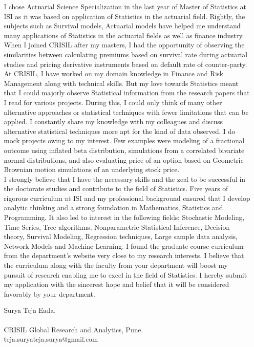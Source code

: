 \documentclass[10pt]{article}
\begin{document}
I chose Actuarial Science Specialization in the last year of Master of Statistics at ISI as it was based on application of Statistics in the actuarial field. Rightly, the subjects such as Survival models, Actuarial models have helped me understand many applications of Statistics in the actuarial fields as well as finance industry. When I joined CRISIL after my masters, I had the opportunity of observing the similarities between calculating premiums based on survival rate during actuarial studies and pricing derivative instruments based on default rate of counter-party.  \\

At CRISIL, I have worked on my domain knowledge in Finance and Risk Management along with technical skills. But my love towards Statistics meant that I could majorly observe Statistical information from the research papers that I read for various projects. During this, I could only think of many other alternative approaches or statistical techniques with fewer limitations that can be applied. I constantly share my knowledge with my colleagues and discuss alternative statistical techniques more apt for the kind of data observed. I do mock projects owing to my interest. Few examples were modeling of a fractional outcome using inflated beta distribution, simulations from a correlated bivariate normal distributions, and also evaluating price of an option based on Geometric Brownian motion simulations of an underlying stock price. \\

I strongly believe that I have the necessary skills and the zeal to be successful in the doctorate studies and contribute to the field of Statistics. Five years of rigorous curriculum at ISI and my professional background ensured that I develop analytic thinking and a strong foundation in Mathematics, Statistics and Programming. It also led to interest in the following fields; Stochastic Modeling, Time Series, Tree algorithms, Nonparametric Statistical Inference, Decision theory, Survival Modeling, Regression techniques, Large sample data analysis, Network Models and Machine Learning.  I found the graduate course curriculum from the department’s website very close to my research interests. I believe that the curriculum along with the faculty from your department will boost my pursuit of research enabling me to excel in the field of Statistics. I hereby submit my application with the sincerest hope and belief that it will be considered favorably by your department. \\


\begin{flushleft}

Surya Teja Eada.\\
\ \ \\
CRISIL Global Research and Analytics, Pune.\\
teja.suryateja.surya@gmail.com

\end{flushleft}
\end{document}
